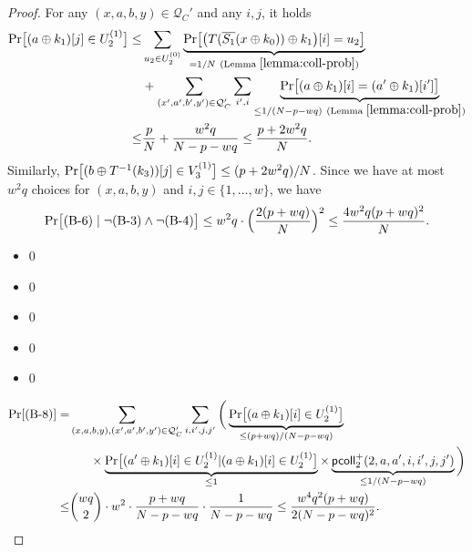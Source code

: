 \begin{proof}
For any $(x,a,b,y)\in\mathcal{Q}_C'$ and any $i,j$, it holds
%
\begin{align}
{\Pr}\big[(a\oplus k_1)[j]\in U_2^{(1)}\big] \leq  &  \sum_{u_2\in U_2^{(0)}}  \underbrace{{\Pr}\big[\big(T(\overline{S_1}(x\oplus k_0))\oplus k_1\big)[i]=u_2\big]}_{=1/N\ (\text{Lemma }\ref{lemma:coll-prob})}       \notag        \\
& +
\sum_{(x',a',b',y')\in\mathcal{Q}_C'}\sum_{i',i} \underbrace{{\Pr}\big[(a\oplus k_1)[i]=(a'\oplus k_1)[i']\big]}_{\leq1/(N-p-wq)\ (\text{Lemma }\ref{lemma:coll-prob})}         \notag      \\
\leq  &  \frac{p}{N}+\frac{w^2q}{N-p-wq} \leq \frac{p+2w^2q}{N}.
\notag
\end{align}
Similarly, ${\Pr}\big[(b\oplus T^{-1}(k_3))[j]\in V_3^{(1)}\big]\leq(p+2w^2q)/N$. Since we have at most $w^2q$ choices for $(x,a,b,y)$ and $i, j \in\{1, \ldots, w\}$, we have
%
$$
{\Pr}\big[\text{(B-6)}\mid\neg\text{(B-3)}\wedge\neg\text{(B-4)}\big] \leq
w^2q\cdot\Big(\frac{2(p+wq)}{N}\Big)^2\leq \frac{4w^2q(p+wq)^2}{N}.
$$


%
\begin{itemize}
	\item 0
	\item 0
	\item 0
	\item 0
	\item 0
\end{itemize}
	\begin{align*}
	\Pr[\text{(B-8)}] 
	=   &  \sum_{(x,a,b,y),(x',a',b',y')\in\mathcal{Q}_{C}'}\sum_{i,i',j,j'}\bigg(\underbrace{{\Pr}\big[(a\oplus k_1)[i]\in U_2^{(1)}\big]}_{\leq(p+wq)/(N-p-wq)}     \\
	& \ \ \ \ \ \times
	\underbrace{{\Pr}\big[(a'\oplus k_1)[i]\in U_2^{(1)}|(a\oplus k_1)[i]\in U_2^{(1)}\big]}_{\leq1}\times\underbrace{\mathsf{pcoll}_{2}^+(2,a,a',i,i',j,j')}_{\leq1/(N-p-wq)}   \bigg)      \\
	\leq  &  {wq\choose 2}\cdot w^2\cdot\frac{p+wq}{N-p-wq}\cdot\frac{1}{N-p-wq}\leq
	\frac{w^4q^2(p+wq)}{2(N-p-wq)^2}.
	\end{align*}
	

\end{proof}
